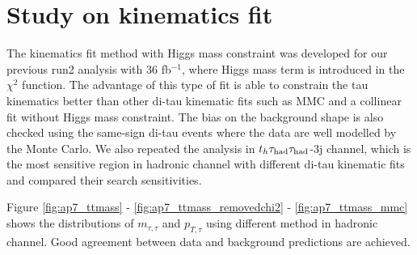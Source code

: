 \section{Study on kinematics fit}
\label{sec:kine}

The kinematics fit method with Higgs mass constraint was developed for our previous run2 analysis with 36 fb$^{-1}$, where Higgs mass term is introduced
in the $\chi^2$ function. The advantage of this type of fit is able to constrain the tau kinematics better than other di-tau kinematic fits such as MMC and
a collinear fit without Higgs mass constraint. The bias on the background shape is also checked using the same-sign di-tau events where the data are well modelled
by the Monte Carlo. We also repeated the analysis in $t_h\tau_\text{had}{}\tau_\text{had}$-3j channel, which is the most sensitive region in hadronic channel with different di-tau kinematic fits and compared their search sensitivities.

Figure \ref{fig:ap7_ttmass} - \ref{fig:ap7_ttmass_removedchi2} - \ref{fig:ap7_ttmass_mmc} shows the distributions of $m_{\tau,\tau}$ and $p_{T,\tau}$ using different method in hadronic channel. Good agreement between data and background predictions are achieved.




